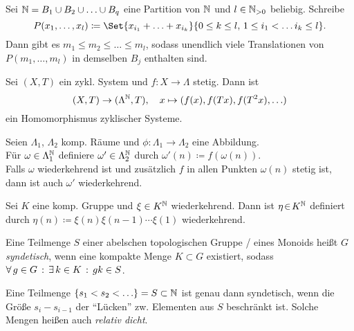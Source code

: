 \documentclass{cheat-sheet}
\begin{document}
\begin{lem}[Hilbert]
  Sei $\mathbb{N} = B_1 \cup B_2 \cup \ldots \cup B_q$ eine Partition von $\mathbb{N}$ und $l \in \mathbb{N}_{>0}$ beliebig.
  Schreibe
  \[ P(x_1, \ldots, x_l) \coloneqq \Set{ x_{i_1} + \ldots + x_{i_k} }{0 \leq k \leq l, \, 1 \leq i_1 < \ldots i_k \leq l}. \]
  Dann gibt es $m_1 \leq m_2 \leq \ldots \leq m_l$, sodass unendlich viele Translationen von $P(m_1, \ldots, m_l)$ in demselben $B_j$ enthalten sind.
\end{lem}

\begin{bem}
  Sei $(X, T)$ ein zykl. System und $f : X \to \Lambda$ stetig. Dann ist
  \[
    (X, T) \to (\Lambda^{\mathbb{N}}, T), \quad
    x \mapsto (f(x), f(Tx), f(T^2x), \ldots)
  \]
  ein Homomorphismus zyklischer Systeme.

\end{bem}

\begin{thm}
  Seien $\Lambda_1$, $\Lambda_2$ komp. Räume und $\phi : \Lambda_1 \to \Lambda_2$ eine Abbildung. \\
  Für $\omega \in \Lambda_1^{\mathbb{N}}$ definiere $\omega' \in \Lambda_2^{\mathbb{N}}$ durch $\omega'(n) \coloneqq f(\omega(n))$. \\
  Falls $\omega$ wiederkehrend ist und zusätzlich $f$ in allen Punkten $\omega(n)$ stetig ist, dann ist auch $\omega'$ wiederkehrend.
\end{thm}


\begin{prop}
  Sei $K$ eine komp. Gruppe und $\xi \in K^{\mathbb{N}}$ wiederkehrend. Dann ist $\eta \!\in\! K^{\mathbb{N}}$ definiert durch $\eta(n) \coloneqq \xi(n) \xi(n-1) \cdots \xi(1)$ wiederkehrend.
\end{prop}



\begin{defn}
  Eine Teilmenge $S$ einer abelschen topologischen Gruppe / eines Monoids heißt $G$ \emph{syndetisch}, wenn eine kompakte Menge $K \subset G$ existiert, sodass $\forall \, {g \in G} \,:\, \exists \, {k \in K} \,:\, gk \in S$.
\end{defn}

\begin{bem}
  Eine Teilmenge $\{ s_1 < s_2 < \ldots \} = S \subset \mathbb{N}$ ist genau dann syndetisch, wenn die Größe $s_i - s_{i-1}$ der "`Lücken"' zw. Elementen aus $S$ beschränkt ist.
  Solche Mengen heißen auch \emph{relativ dicht}.
\end{bem}
\end{document}
